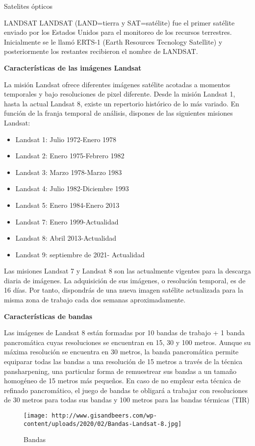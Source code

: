 \documentclass[
  ignorenonframetext,
]{beamer}
\providecommand{\tightlist}{%
  \setlength{\itemsep}{0pt}\setlength{\parskip}{0pt}}
\begin{document}
\begin{frame}{Satelites ópticos}
\protect\hypertarget{satelites-uxf3pticos}{}
\begin{block}{LANDSAT}
\protect\hypertarget{landsat}{}
LANDSAT (LAND=tierra y SAT=satélite) fue el primer satélite enviado por
los Estados Unidos para el monitoreo de los recursos terrestres.
Inicialmente se le llamó ERTS-1 (Earth Resources Tecnology Satellite) y
posteriormente los restantes recibieron el nombre de LANDSAT.

\textbf{Características de las imágenes Landsat}

La misión Landsat ofrece diferentes imágenes satélite acotadas a
momentos temporales y bajo resoluciones de pixel diferente. Desde la
misión Landsat 1, hasta la actual Landsat 8, existe un repertorio
histórico de lo más variado. En función de la franja temporal de
análisis, dispones de las siguientes misiones Landsat:

\begin{itemize}
\tightlist
\item
  Landsat 1: Julio 1972-Enero 1978
\item
  Landsat 2: Enero 1975-Febrero 1982
\item
  Landsat 3: Marzo 1978-Marzo 1983
\item
  Landsat 4: Julio 1982-Diciembre 1993
\item
  Landsat 5: Enero 1984-Enero 2013
\item
  Landsat 7: Enero 1999-Actualidad
\item
  Landsat 8: Abril 2013-Actualidad
\item
  Landsat 9: septiembre de 2021- Actualidad
\end{itemize}

Las misiones Landsat 7 y Landsat 8 son las actualmente vigentes para la
descarga diaria de imágenes. La adquisición de sus imágenes, o
resolución temporal, es de 16 días. Por tanto, dispondrás de una nueva
imagen satélite actualizada para la misma zona de trabajo cada dos
semanas aproximadamente.

\textbf{Características de bandas}

Las imágenes de Landsat 8 están formadas por 10 bandas de trabajo + 1
banda pancromática cuyas resoluciones se encuentran en 15, 30 y 100
metros. Aunque su máxima resolución se encuentra en 30 metros, la banda
pancromática permite equiparar todas las bandas a una resolución de 15
metros a través de la técnica pansharpening, una particular forma de
remuestrear sus bandas a un tamaño homogéneo de 15 metros más pequeños.
En caso de no emplear esta técnica de refinado pancromático, el juego de
bandas te obligará a trabajar con resoluciones de 30 metros para todas
sus bandas y 100 metros para las bandas térmicas (TIR)

\begin{figure}
\centering
\texttt{[image: http://www.gisandbeers.com/wp-content/uploads/2020/02/Bandas-Landsat-8.jpg]}
\caption{Bandas}
\end{figure}
\end{block}
\end{frame}
\end{document}
